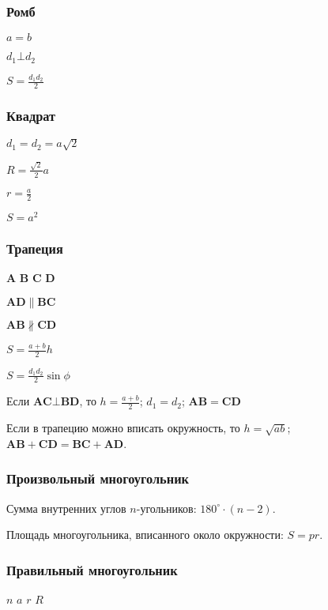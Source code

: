 \subsubsection{Ромб}

$ a = b $

$ d_1 \bot d_2 $

$ S = \frac{d_1 d_2}{2} $

\subsubsection{Квадрат}

$ d_1 = d_2 = a\sqrt{2} $

$ R = \frac{\sqrt{2}}{2} a $

$ r = \frac{a}{2} $

$ S = a^2 $

\subsubsection{Трапеция}

$\boldsymbol{A}$
$\boldsymbol{B}$
$\boldsymbol{C}$
$\boldsymbol{D}$

$ \boldsymbol{AD} \parallel \boldsymbol{BC} $

$ \boldsymbol{AB} \nparallel \boldsymbol{CD} $

$ S = \frac{a + b}{2} h $

$ S = \frac{d_1 d_2}{2} \sin \phi $

Если $ \boldsymbol{AC} \bot \boldsymbol{BD} $, то $ h = \frac{a + b}{2} $; $ d_1 = d_2 $; $ \boldsymbol{AB} = \boldsymbol{CD} $

Если в трапецию можно вписать окружность, то $ h = \sqrt{ab}$; $ \boldsymbol{AB} + \boldsymbol{CD} = \boldsymbol{BC} + \boldsymbol{AD} $.

\subsubsection{Произвольный многоугольник}

Сумма внутренних углов $n$-угольников: $ 180^{\circ}\cdot (n-2) $.

Площадь многоугольника, вписанного около окружности: $S = p r$.

\subsubsection{Правильный многоугольник}

$n$
$a$
$r$
$R$

